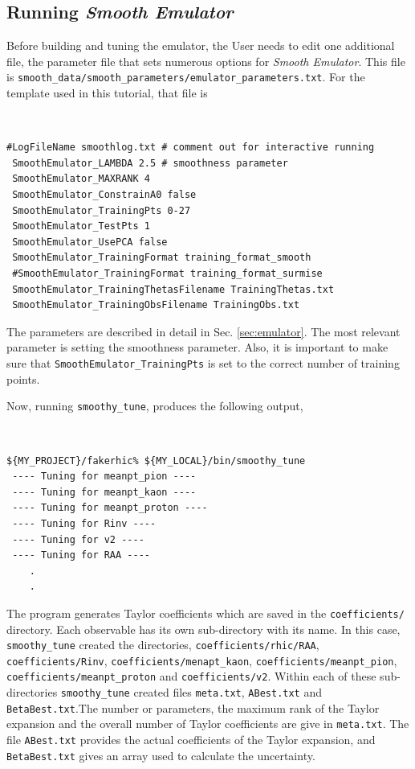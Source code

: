 \documentclass[UserManual.tex]{subfiles}
\begin{document}
\subsection{Running {\it Smooth Emulator}}
Before building and tuning the emulator, the User needs to edit one additional file, the parameter file that sets numerous options for {\it Smooth Emulator}. This file is {\tt smooth\_data/smooth\_parameters/emulator\_parameters.txt}. For the template used in this tutorial, that file is
{\tt
\begin{verbatim}
#LogFileName smoothlog.txt # comment out for interactive running
 SmoothEmulator_LAMBDA 2.5 # smoothness parameter
 SmoothEmulator_MAXRANK 4
 SmoothEmulator_ConstrainA0 false
 SmoothEmulator_TrainingPts 0-27
 SmoothEmulator_TestPts 1
 SmoothEmulator_UsePCA false
 SmoothEmulator_TrainingFormat training_format_smooth
 #SmoothEmulator_TrainingFormat training_format_surmise
 SmoothEmulator_TrainingThetasFilename TrainingThetas.txt
 SmoothEmulator_TrainingObsFilename TrainingObs.txt
\end{verbatim}
}
The parameters are described in detail in Sec. \ref{sec:emulator}. The most relevant parameter is setting the smoothness parameter. Also, it is important to make sure that {\tt SmoothEmulator\_TrainingPts} is set to the correct number of training points. 

Now, running {\tt smoothy\_tune}, produces the following output,

{\tt
\begin{verbatim}
${MY_PROJECT}/fakerhic% ${MY_LOCAL}/bin/smoothy_tune
 ---- Tuning for meanpt_pion ----
 ---- Tuning for meanpt_kaon ----
 ---- Tuning for meanpt_proton ----
 ---- Tuning for Rinv ----
 ---- Tuning for v2 ----
 ---- Tuning for RAA ----
    .
    .
\end{verbatim}
}


The program generates Taylor coefficients which are saved in the {\tt coefficients/} directory. Each observable has its own sub-directory with its name. In this case, {\tt smoothy\_tune} created the directories, {\tt coefficients/rhic/RAA}, {\tt coefficients/Rinv}, {\tt coefficients/menapt\_kaon}, {\tt coefficients/meanpt\_pion}, {\tt coefficients/meanpt\_proton} and {\tt coefficients/v2}. Within each of these sub-directories {\tt smoothy\_tune} created files {\tt meta.txt}, {\tt ABest.txt} and {\tt BetaBest.txt}.The number or parameters, the maximum rank of the Taylor expansion and the overall number of Taylor coefficients are give in {\tt meta.txt}. The file {\tt ABest.txt} provides the actual coefficients of the Taylor expansion, and {\tt BetaBest.txt} gives an array used to calculate the uncertainty. 
\end{document}
